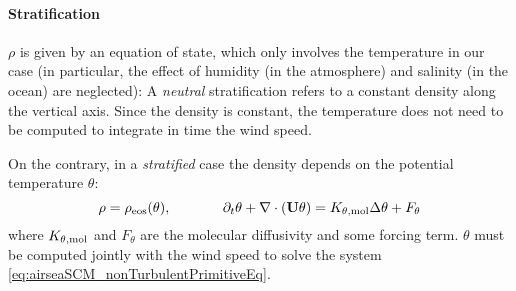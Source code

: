 \paragraph{Stratification}
$\rho$ is given by an equation of state, which only involves
the temperature in our case (in particular, the effect
of humidity (in the atmosphere) and salinity (in the ocean)
are neglected):
A \textit{neutral} stratification refers to a constant 
density along the vertical axis. Since the density is
constant, the temperature does not need to be computed
to integrate in time the wind speed.
\par
On the contrary, in a \textit{stratified} case the
density depends on the potential temperature $\theta$:
\begin{equation}
	\rho = \rho_{\rm eos}(\theta), ~~~~~~~~~~~
	\partial_t \theta + \nabla \cdot (\mathbf{U} \theta) =
	K_{\theta, {\rm mol}} \Delta \theta + F_\theta
\end{equation}
where $K_{\theta, {\rm mol}}$ and $F_\theta$ are
the molecular diffusivity and some forcing term.
$\theta$ must be computed jointly with the wind
speed to solve the system
\eqref{eq:airseaSCM_nonTurbulentPrimitiveEq}.

